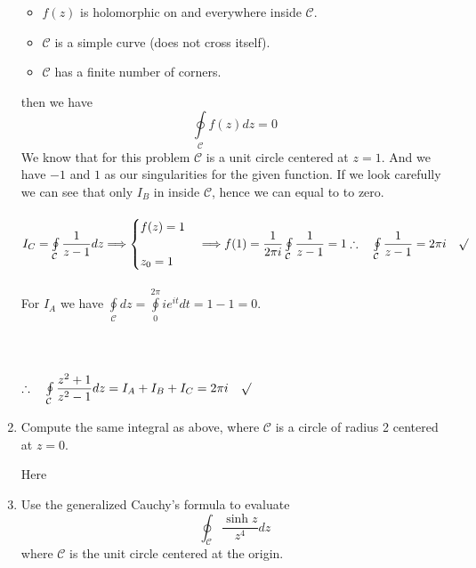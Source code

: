 \documentclass[fleqn]{article}
\begin{document}
\begin{enumerate}
{\begin{itemize}
            \item $f(z)$ is holomorphic on and everywhere inside $\mathcal{C}$.
            \item $\mathcal{C}$ is a simple curve (does not cross itself).
            \item $\mathcal{C}$ has a finite number of corners.
          \end{itemize}
          then we have 
          $$\oint\limits_{\mathcal{C}} f(z) dz=0$$
          We know that for this problem $\mathcal{C}$ is a unit circle centered at $z=1$. And we have $-1$ and $1$ as 
          our singularities for the given function. If we look carefully we can see that only $I_B$ in inside $\mathcal{C}$,
          hence we can equal to to zero. \\
          \\
          $
            I_C=\oint\limits_{\mathcal{C}} \dfrac{1}{z-1}dz \Longrightarrow \begin{cases}
              f(z)=1 \\
              \\
              z_0=1 
            \end{cases}
            \Longrightarrow f(1)=\dfrac{1}{2 \pi i} \oint\limits_{\mathcal{C}} \dfrac{1}{z-1}=1 \\
            \\
            \\
            \therefore ~~~ \oint\limits_{\mathcal{C}} \dfrac{1}{z-1}=2 \pi i ~~~ \surd
          $ 
          \\
          \\
          For $I_A$ we have $\oint\limits_{\mathcal C} dz=\oint\limits_{0}^{2 \pi} i e^{it} dt=1-1=0$. \\
          \\
          \\
          \\
          $
            \therefore ~~~ \oint\limits_{\mathcal C} \dfrac{z^2+1}{z^2-1} dz=I_A+I_B+I_C=2 \pi i ~~~ \surd
          $
        }

      \item Compute the same integral as above, where $\mathcal{C}$ is a circle of radius 2 centered at $z=0$.
      
        \textcolor{hwColor}{
          Here
        }

      \pagebreak

      \item Use the generalized Cauchy's formula to evaluate
      $$
      \oint_{\mathcal C}   \frac{\sinh z}{z^4} dz
      $$
      where ${\mathcal C}$ is the unit circle centered at the origin.



\end{enumerate}
\end{document}
